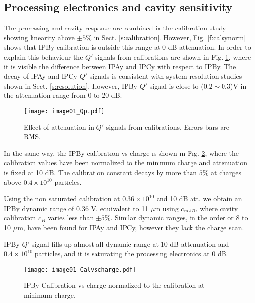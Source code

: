 \subsection{Processing electronics and cavity sensitivity}
The processing and cavity response are combined in the calibration study showing linearity above $\pm5\%$ in Sect. \ref{s:calibration}. However, Fig. \ref{f:calsynorm} shows that IPBy calibration is outside this range at 0 dB attenuation. In order to explain this behaviour the $Q'$ signals from calibrations are shown in Fig. \ref{f:Qp}, where it is visible the difference between IPAy and IPCy with respect to IPBy. The decay of IPAy and IPCy $Q'$ signals is consistent with system resolution studies shown in Sect. \ref{s:resolution}. However, IPBy $Q'$ signal is close to ($0.2\sim0.3$)V in the attenuation range from 0 to 20 dB.\par%
\begin{figure}[!htb]
\centering
 \texttt{[image: image01\_Qp.pdf]}\caption{Effect of attenuation in $Q'$ signals from calibrations. Errors bars are RMS.}\label{f:Qp}
\end{figure}
In the same way, the IPBy calibration vs charge is shown in Fig. \ref{f:chargescan}, where the calibration values have been normalized to the minimum charge and attenuation is fixed at 10 dB. The calibration constant decays by more than $5\%$ at charges above $0.4\times10^{10}$ particles.\par
Using the non saturated calibration at $0.36\times10^{10}$ and 10 dB att. we obtain an IPBy dynamic range of 0.36 V, equivalent to 11 $\mu$m using $c_{mAB}$, where cavity calibration $c_B$ varies less than $ \pm5\%$.  Similar dynamic ranges, in the order or 8 to 10 $\mu$m, have been found for IPAy and IPCy, however they lack the charge scan.\par
IPBy $Q'$ signal fills up almost all dynamic range at 10 dB attenuation and $0.4\times10^{10}$ particles, and it is saturating the processing electronics at 0 dB.\par
\begin{figure}[!htb]
\centering%
 \texttt{[image: image01\_Calvscharge.pdf]}\caption{IPBy Calibration vs charge normalized to the calibration at minimum charge.}\label{f:chargescan}
\end{figure}
